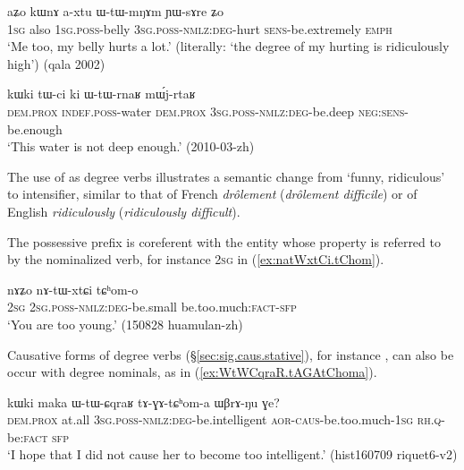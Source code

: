\begin{exe}
\ex \label{ex:axtu.WtWmNAm}
\gll aʑo kɯnɤ a-xtu ɯ-tɯ-mŋɤm ɲɯ-sɤre ʑo \\
\textsc{1sg} also \textsc{1sg}.\textsc{poss}-belly \textsc{3sg}.\textsc{poss}-\textsc{nmlz}:\textsc{deg}-hurt \textsc{sens}-be.extremely \textsc{emph} \\
\glt `Me too, my belly hurts a lot.' (literally: `the degree of my hurting is ridiculously high') (qala 2002)
\end{exe}

\begin{exe}
\ex \label{ex:WtWrnaR.mWjrtaR}
\gll kɯki tɯ-ci ki ɯ-tɯ-rnaʁ mɯ́j-rtaʁ \\
\textsc{dem}.\textsc{prox} \textsc{indef}.\textsc{poss}-water \textsc{dem}.\textsc{prox} \textsc{3sg}.\textsc{poss}-\textsc{nmlz}:\textsc{deg}-be.deep \textsc{neg}:\textsc{sens}-be.enough \\
\glt `This water is not deep enough.' (2010-03-zh)
\end{exe}

The use of  as degree verbs illustrates a semantic change from `funny, ridiculous' to intensifier, similar to that of French \textit{drôlement} (\textit{drôlement difficile}) or of English \textit{ridiculously} (\textit{ridiculously difficult}).

The possessive prefix is coreferent with the entity whose property is referred to by the nominalized verb, for instance \textsc{2sg} in (\ref{ex:natWxtCi.tChom}). 

\begin{exe}
\ex \label{ex:natWxtCi.tChom}
\gll nɤʑo nɤ-tɯ-xtɕi tɕʰom-o \\
\textsc{2sg} \textsc{2sg}.\textsc{poss}-\textsc{nmlz}:\textsc{deg}-be.small be.too.much:\textsc{fact}-\textsc{sfp} \\
\glt `You are too young.' (150828 huamulan-zh)
\end{exe}

Causative forms of degree verbs (§\ref{sec:sig.caus.stative}), for instance , can also be occur with degree nominals, as in (\ref{ex:WtWCqraR.tAGAtChoma}).

\begin{exe}
\ex \label{ex:WtWCqraR.tAGAtChoma}
\gll kɯki maka ɯ-tɯ-ɕqraʁ tɤ-ɣɤ-tɕʰom-a ɯβrɤ-ŋu ɣe? \\
\textsc{dem}.\textsc{prox} at.all  \textsc{3sg}.\textsc{poss}-\textsc{nmlz}:\textsc{deg}-be.intelligent \textsc{aor}-\textsc{caus}-be.too.much-\textsc{1sg} \textsc{rh}.\textsc{q}-be:\textsc{fact} \textsc{sfp} \\
\glt `I hope that I did not cause her to become too intelligent.' (hist160709 riquet6-v2)
\end{exe}

